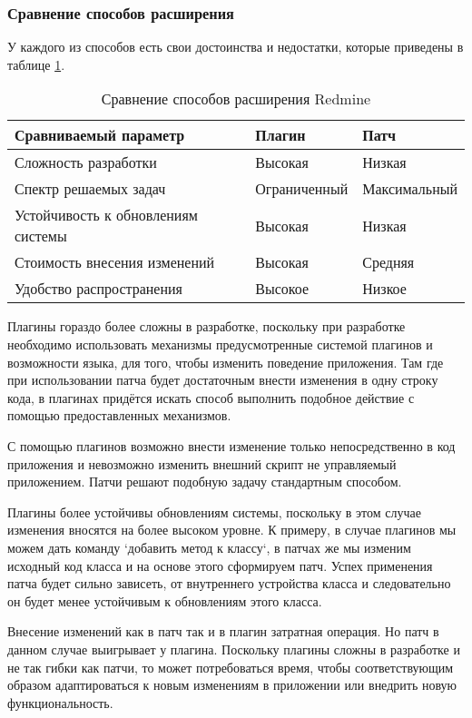 \subsubsection{Сравнение способов расширения}
У каждого из способов есть свои достоинства и недостатки, которые приведены в
таблице \ref{comparing_extensions}.
\begin{table}[hb!]
\small
\centering
\begin{tabular}{ 
|>{\centering\arraybackslash}m{}
|>{\centering\arraybackslash}m{}
|>{\centering\arraybackslash}m{}|}
\hline
\textbf{Сравниваемый параметр} & \textbf{Плагин} & \textbf{Патч}\\
\hline
Сложность разработки & Высокая & Низкая \\
\hline
Спектр решаемых задач & Ограниченный & Максимальный\\
\hline
Устойчивость к обновлениям системы & Высокая & Низкая \\
\hline
Стоимость внесения изменений & Высокая & Средняя \\
\hline
Удобство распространения & Высокое & Низкое \\
\hline
\end{tabular}
\caption{Сравнение способов расширения Redmine}
\label{comparing_extensions}
\end{table}

Плагины гораздо более сложны в разработке, поскольку при разработке необходимо
использовать механизмы предусмотренные системой плагинов и возможности языка,
для того, чтобы изменить поведение приложения. Там где при
использовании патча будет достаточным внести изменения в одну строку кода, в
плагинах придётся искать способ выполнить подобное действие с помощью
предоставленных механизмов.

С помощью плагинов возможно внести изменение только непосредственно в код
приложения и невозможно изменить внешний скрипт не управляемый приложением.
Патчи решают подобную задачу стандартным способом.

Плагины более устойчивы обновлениям системы, поскольку в этом случае изменения
вносятся на более высоком уровне. К примеру, в случае плагинов мы можем дать
команду `добавить метод к классу`, в патчах же мы изменим исходный код класса и
на основе этого сформируем патч. Успех применения патча будет сильно зависеть,
от внутреннего устройства класса и следовательно он будет менее устойчивым к
обновлениям этого класса.

Внесение изменений как в патч так и в плагин затратная операция. Но патч в
данном случае выигрывает у плагина. Поскольку плагины сложны в разработке и не
так гибки как патчи, то может потребоваться время, чтобы соответствующим
образом адаптироваться к новым изменениям в приложении или внедрить новую
функциональность.

